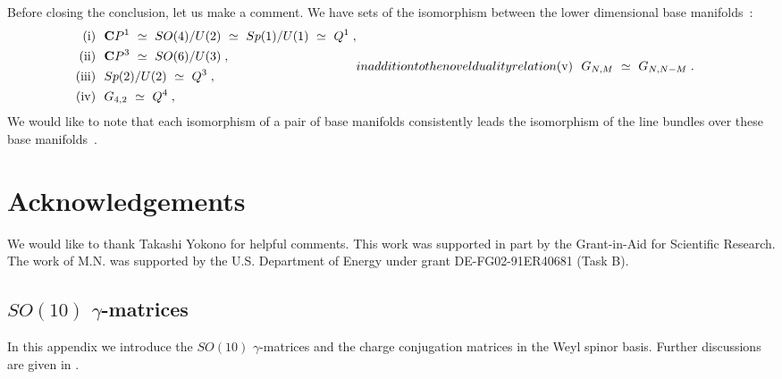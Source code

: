 \documentclass[a4paper,11pt]{article}
\newcommand{\bsubeq}{\begin{subequations}}
\newcommand{\esubeq}{\end{subequations}}
\begin{document}
{\begin{table}[h]
\begin{center}
\label{HSS-table}
\end{center}
\end{table}

Before closing the conclusion,
let us make a comment.
We have sets of the isomorphism between the lower dimensional
base manifolds~\cite{HKN3}:
\bsubeq
\begin{align}
({\rm i}) \ \ &{\bf C}P^1 \ \simeq \ SO(4)/U(2) \ \simeq \ Sp(1) /
U(1) \ \simeq \ Q^1 \; , \\
({\rm ii}) \ \ &{\bf C}P^3 \ \simeq \ SO(6) / U(3) \; , \\
({\rm iii}) \ \ &Sp(2)/U(2) \ \simeq \ Q^3 \; , \\
({\rm iv}) \ \ &G_{4,2} \ \simeq \ Q^4 \; ,
\end{align}
in addition to the novel duality relation
\begin{align}
({\rm v}) \ \ &G_{N,M} \ \simeq \ G_{N,N-M} \; .
\end{align}
\esubeq
We would like to note that each isomorphism of a pair 
of base manifolds consistently leads the isomorphism of 
the line bundles over these base manifolds~\cite{HKN3}.

\section*{Acknowledgements}

We would like to thank Takashi Yokono for helpful comments.
This work was supported in part by the Grant-in-Aid for Scientific
Research.
The work of M.N. was supported by the U.S. 
Department of Energy under grant DE-FG02-91ER40681 (Task B). 


\begin{appendix}

\section{$SO(10)$ $\gamma$-matrices} \label{SO10}

In this appendix we introduce the $SO(10)$ $\gamma$-matrices and the
charge conjugation matrices in the Weyl spinor basis.
Further discussions are given in \cite{KS}.


\end{appendix}}
\end{document}
